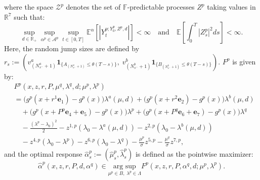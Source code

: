 \documentclass[12pt]{article}
\begin{document}
where the space $\mathcal{Z}^p$ denotes the set of $\mathbb{F}$-predictable processes $Z^p$ taking values in $\mathbb{R}^{7}$ such that:
\[ \sup_{d \in \mathbb{R}_+} \sup_{\alpha^p \in \mathcal{A}^p} \sup_{t \in [0,T]} \mathbb{E}^{\alpha} \left[ |Y_t^{p;Y_0^p,Z^p,d}| \right] < \infty \quad \text{and} \quad \mathbb E\left[\int_0^T |Z^p_s|^2 ds\right] < \infty.\]
Here, the random jump sizes are defined by $r_s := \left( v_{(N_{s^-}^a+1)}^a \mathbf{1}_{\{A_{(N_{s^-}^a+1)} \leq \theta(T - s)\}}, \; v_{(N_{s^-}^b+1)}^b \mathbf{1}_{\{B_{(N_{s^-}^b+1)} \leq \theta(T - s)\}} \right)$. 
$F^p$ is given by:
\begin{align*} 
    &F^p(x, z, r, P, \mu^q, \lambda^q, d; \mu^p, \lambda^p) \\
    &= \big( g^p(x + r^1\mathbf{e}_1) - g^p(x) \big) \lambda^a(\mu,d) + \big( g^p(x + r^2\mathbf{e}_2) - g^p(x) \big) \lambda^b(\mu,d) \\
    &\quad + \big( g^p(x + P^p\mathbf{e}_4 + \mathbf{e}_5) - g^p(x) \big) \lambda^p + \big(g^p(x + P^q\mathbf{e}_6 + \mathbf{e}_7) - g^p(x)\big) \lambda^{q} \\
    &\quad - \frac{(\lambda^p - \lambda_0 )^2}{2} - z^{1,p} (\lambda_0 - \lambda^a(\mu,d)) - z^{2,p} (\lambda_0 - \lambda^b(\mu,d)) \\
    &\quad - z^{4,p}(\lambda_0 - \lambda^p) - z^{6,p} (\lambda_0 - \lambda^{q}) - \frac{\mu^p}{\sigma} z^{5,p} - \frac{\mu^q}{\sigma} z^{7,p},
\end{align*}
and the optimal response $\hat{\alpha}^p_s := (\hat{\mu}^p_s, \hat{\lambda}^p_s)$ is defined as the pointwise maximizer:
\[ \hat{\alpha}^p(x,z,r,P,d,\alpha^q) \in \underset{\mu^p \in B, \; \lambda^p \in \Lambda}{\text{arg sup}} F^p(x,z,r,P,\alpha^q,d;\mu^p,\lambda^p). \]
\end{document}
